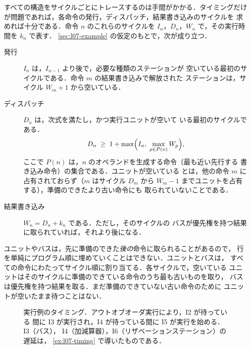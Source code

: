 \documentclass[../main.tex]{subfiles}
\begin{document}
すべての構造をサイクルごとにトレースするのは手間がかかる．タイミングだけ
が問題であれば，各命令の発行，ディスパッチ，結果書き込みのサイクルを
求めれば十分である．命令 $n$
のこれらのサイクルを $I_n$，$D_n$，$W_n$ で，その実行時間を $k_n$ で表す．
\cref{sec:l07-example} の仮定のもとで，次が成り立つ．
\begin{description}
  \item[発行] $I_n$ は，$I_{n-1}$ より後で，必要な種類のステーションが
    空いている最初のサイクルである．命令 $m$ の結果書き込みで解放された
    ステーションは，サイクル $W_m+1$ から空いている．
  \item[ディスパッチ] $D_n$ は，次式を満たし，かつ実行ユニットが空いて
    いる最初のサイクルである．
    \begin{equation}
      D_n \;\ge\; 1 + \max\Bigl(I_n,\; \max_{p \in P(n)} W_p\Bigr) ,
      \label{eq:l07-dispatch}
    \end{equation}
    ここで $P(n)$ は，$n$ のオペランドを生成する命令（最も近い先行する
    書き込み命令）の集合である．ユニットが空いている
    とは，他の命令 $m$ に占有されておらず（$m$ はサイクル $D_m$ から
    $W_m - 1$ までユニットを占有する），準備のできたより古い命令にも
    取られていないことである．
  \item[結果書き込み] $W_n = D_n + k_n$ である．ただし，そのサイクルの
    バスが優先権を持つ結果に取られていれば，それより後になる．
\end{description}
ユニットやバスは，先に準備のできた\emph{後の}命令に取られることがあるので，
行を単純にプログラム順に埋めていくことはできない．ユニットとバスは，
すべての命令にわたってサイクル順に割り当てる．各サイクルで，空いている
ユニットはそのサイクルに準備のできている命令のうち最も古いものを取り，
バスは優先権を持つ結果を取る．まだ準備のできていない古い命令のために
ユニットが空いたまま待つことはない．

\begin{figure}[htbp]
  \centering
  
  \caption{実行例のタイミング．アウトオブオーダ実行により，I2 が待っている
    間に I3 が実行され，I4 が待っている間に I5 が実行を始める．I3（バス），
    I4（加減算器），I6（リザベーションステーション）の遅延は，
    \cref{ex:l07-timing} で導いたものである．}
  \label{fig:l07-timing}
\end{figure}
\end{document}
